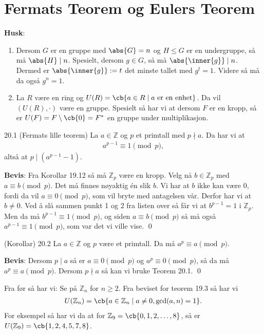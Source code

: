 \section{Fermats Teorem og Eulers Teorem}
\textbf{Husk}:
\begin{enumerate}
	\item Dersom $G$ er en gruppe med $\abs{G}=n$ og $H \leq G$ er en undergruppe, så må
	      $\abs{H} \mid n$. Spesielt, dersom $g\in G$, så må $\abs{\inner{g}}\mid n$. Dermed er
	      $\abs{\inner{g}}:=t$ det minste tallet med $g^t = 1$. Videre så må da også $g^n = 1$.
      \item La $R$ være en ring og $U(R) = \cb{a\in R\mid a\text{ er en enhet}}$. Da vil 
        $(U(R), \cdot)$ være en gruppe. Spesielt så har vi at dersom $F$ er en kropp, så er
        $U(F) = F\setminus \cb{0} = F^*$ en gruppe under multiplikasjon.
\end{enumerate}

\begin{theorem*}{20.1 (Fermats lille teorem)}{}
  La $a \in \mathbb{Z}$ og $p$ et primtall med $p \nmid a$. Da har vi at 
  \begin{align}
    a^{p-1}\equiv 1\pmod{p},
  \end{align}
  altså at $p\mid (a^{p-1}-1)$. 
\end{theorem*}

\textbf{Bevis}: Fra Korollar 19.12 så må $\mathbb{Z}_p$ være en kropp. Velg nå $b\in \mathbb{Z}_p$
med $a \equiv b \pmod{p}$. Det må finnes nøyaktig én slik $b$. Vi har at $b$ ikke kan være 0,
fordi da vil $a \equiv 0 \pmod{p}$, som vil bryte med antagelsen vår. Derfor har vi at $b \neq 0$.
Ved å slå sammen punkt 1 og 2 fra listen over så får vi at $b^{p-1} = 1$ i $\mathbb{Z}_p$. Men
da må $b^{p-1}\equiv 1 \pmod{p}$, og siden $a \equiv b \pmod{p}$ så må også 
$a^{p-1}\equiv 1\pmod{p}$, som var det vi ville vise. \qed

\begin{theorem*}{(Korollar) 20.2}{}
  La $a\in \mathbb{Z}$ og $p$ være et primtall. Da må $a^p \equiv a \pmod{p}$. 
\end{theorem*}

\textbf{Bevis}: Dersom $p \mid a$ så er $a \equiv 0 \pmod{p}$ og $a^{p}\equiv 0 \pmod{p}$, så
da må $a^p\equiv a\pmod{p}$. Dersom $p\nmid a$ så kan vi bruke Teorem 20.1. \qed

Fra før så har vi: Se på $\mathbb{Z}_n$ for $n\geq 2$. Fra beviset for teorem 19.3 så har vi
\begin{align}
  U(\mathbb{Z}_n)=\cb{a\in \mathbb{Z}_n\mid a\neq 0, \gcd(a, n) = 1}.
\end{align}
For eksempel så har vi da at for $\mathbb{Z}_9 = \cb{0,1,2,\dots,8}$, så er
$U(\mathbb{Z}_9)=\cb{1, 2, 4, 5, 7, 8}$.

